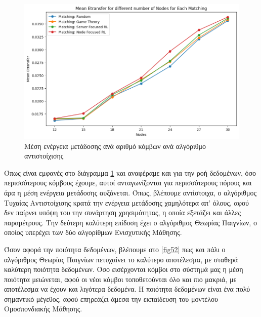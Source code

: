 \begin{figure}[ht]
    \centering
    \includegraphics[width=\textwidth]{figures/chapter3/Mean_Etransfer_vs_Nodes.png}
    \caption{Μέση ενέργεια μετάδοσης ανά αριθμό κόμβων ανά αλγόριθμο αντιστοίχισης}
    \label{fig8}
\end{figure}

Όπως είναι εμφανές στο διάγραμμα \ref{fig8} και αναφέραμε και για την ροή δεδομένων, όσο περισσότερους κόμβους έχουμε, αυτοί ανταγωνίζονται για περισσότερους πόρους και άρα η μέση ενέργεια μετάδοσης αυξάνεται. Όπως, βλέπουμε αντίστοιχα, ο αλγόριθμος Τυχαίας Αντιστοίχισης κρατά την ενέργεια μετάδοσης χαμηλότερα απ' όλους, αφού δεν παίρνει υπόψη του την συνάρτηση χρησιμότητας, η οποία εξετάζει και άλλες παραμέτρους. Την δεύτερη καλύτερη επίδοση έχει ο αλγόριθμος Θεωρίας Παιγνίων, ο οποίος υπερέχει των δύο αλγορίθμων Ενισχυτικής Μάθησης.

Όσον αφορά την ποιότητα δεδομένων, βλέπουμε στο \ref{fig52} πως και πάλι ο αλγόριθμος Θεωρίας Παιγνίων πετυχαίνει το καλύτερο αποτέλεσμα, με σταθερά καλύτερη ποιότητα δεδομένων. Όσο εισέρχονται κόμβοι στο σύστημά μας η μέση ποιότητα μειώνεται, αφού οι νέοι κόμβοι τοποθετούνται όλο και πιο μακριά, με αποτέλεσμα να έχουν και λιγότερα δεδομένα. Η ποιότητα δεδομένων είναι ένα πολύ σημαντικό μέγεθος, αφού επηρεάζει άμεσα την εκπαίδευση του μοντέλου Ομοσπονδιακής Μάθησης. 

\newpage

